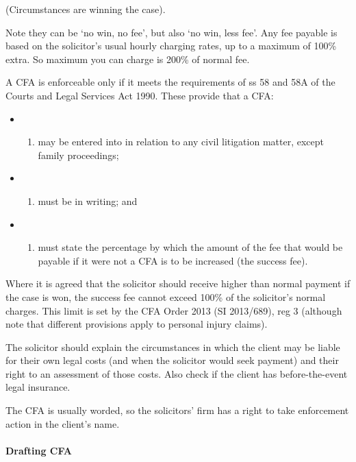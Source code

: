 \documentclass[
]{article}
\providecommand{\tightlist}{%
  \setlength{\itemsep}{0pt}\setlength{\parskip}{0pt}}
\begin{document}
(Circumstances are winning the case).

Note they can be `no win, no fee', but also `no win, less fee'. Any fee
payable is based on the solicitor's usual hourly charging rates, up to a
maximum of 100\% extra. So maximum you can charge is 200\% of normal
fee.

A CFA is enforceable only if it meets the requirements of ss 58 and 58A
of the Courts and Legal Services Act 1990. These provide that a CFA:

\begin{itemize}
\item
  \begin{enumerate}
  \def\labelenumi{(\alph{enumi})}
  \tightlist
  \item
    may be entered into in relation to any civil litigation matter,
    except family proceedings;
  \end{enumerate}
\item
  \begin{enumerate}
  \def\labelenumi{(\alph{enumi})}
  \setcounter{enumi}{1}
  \tightlist
  \item
    must be in writing; and
  \end{enumerate}
\item
  \begin{enumerate}
  \def\labelenumi{(\alph{enumi})}
  \setcounter{enumi}{2}
  \tightlist
  \item
    must state the percentage by which the amount of the fee that would
    be payable if it were not a CFA is to be increased (the success
    fee).
  \end{enumerate}
\end{itemize}

Where it is agreed that the solicitor should receive higher than normal
payment if the case is won, the success fee cannot exceed 100\% of the
solicitor's normal charges. This limit is set by the CFA Order 2013 (SI
2013/689), reg 3 (although note that different provisions apply to
personal injury claims).

The solicitor should explain the circumstances in which the client may
be liable for their own legal costs (and when the solicitor would seek
payment) and their right to an assessment of those costs. Also check if
the client has before-the-event legal insurance.

The CFA is usually worded, so the solicitors' firm has a right to take
enforcement action in the client's name.

\hypertarget{drafting-cfa}{%
\paragraph{Drafting CFA}\label{drafting-cfa}}
\end{document}

